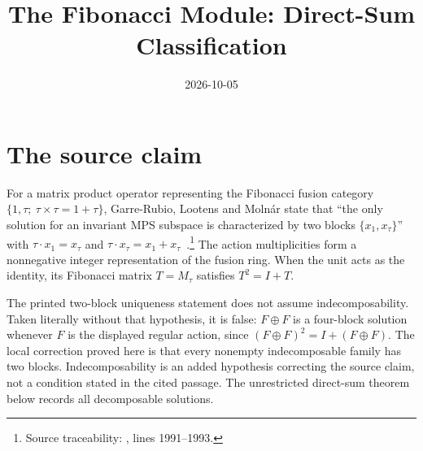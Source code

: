 \documentclass{article}
\title{The Fibonacci Module: Direct-Sum Classification}
\author{}
\date{2026-10-05}
\begin{document}
\maketitle
{}

\section{The source claim}
For a matrix product operator representing the Fibonacci fusion category
$\{1,\tau;\ \tau\times\tau=1+\tau\}$, Garre-Rubio, Lootens and Moln\'ar state
that ``the only solution for an invariant MPS subspace is characterized by two
blocks $\{x_1,x_\tau\}$'' with $\tau\cdot x_1=x_\tau$ and
$\tau\cdot x_\tau=x_1+x_\tau$~\cite{GarreRubio2023MPOSym}.\footnote{Source
    traceability: , lines 1991--1993.}
The action multiplicities form a nonnegative integer representation of the
fusion ring. When the unit acts as the identity, its Fibonacci matrix
$T=M_\tau$ satisfies $T^2=I+T$.

The printed two-block uniqueness statement does not assume
indecomposability. Taken literally without that hypothesis, it is false:
$F\oplus F$ is a four-block solution whenever $F$ is the displayed regular
action, since $(F\oplus F)^2=I+(F\oplus F)$.
The local correction proved here is that every nonempty indecomposable
family has two blocks. Indecomposability is an added hypothesis correcting
the source claim, not a condition stated in the cited passage. The
unrestricted direct-sum theorem below records all decomposable solutions.
\end{document}
